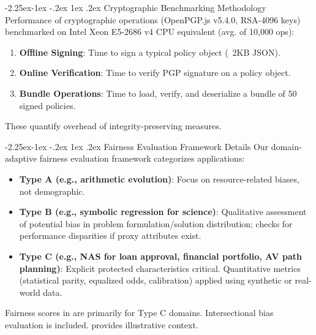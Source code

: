 \documentclass[manuscript,screen,9pt]{acmart}
\makeatletter
\renewcommand\subsection{\@startsection{subsection}{2}{\z@}%
  {-2.25ex\@plus -1ex \@minus -.2ex}%
  {1ex \@plus .2ex}%
  {\normalfont\large\bfseries}}
\makeatother
\begin{document}
\begin{table}[!htb]
\subsection{Cryptographic Benchmarking Methodology}
Performance of cryptographic operations (OpenPGP.js v5.4.0, RSA-4096 keys) benchmarked on Intel Xeon E5-2686 v4 CPU equivalent (avg. of 10,000 ops):
\begin{enumerate}[leftmargin=*,itemsep=1pt,parsep=1pt]
    \item \textbf{Offline Signing}: Time to sign a typical policy object (~2KB JSON).
    \item \textbf{Online Verification}: Time to verify PGP signature on a policy object.
    \item \textbf{Bundle Operations}: Time to load, verify, and deserialize a bundle of 50 signed policies.
\end{enumerate}
These quantify overhead of integrity-preserving measures.

\subsection{Fairness Evaluation Framework Details}
Our domain-adaptive fairness evaluation framework categorizes applications:
\begin{itemize}[leftmargin=*,itemsep=1pt,parsep=1pt]
    \item \textbf{Type A (e.g., arithmetic evolution)}: Focus on resource-related biases, not demographic.
    \item \textbf{Type B (e.g., symbolic regression for science)}: Qualitative assessment of potential bias in problem formulation/solution distribution; checks for performance disparities if proxy attributes exist.
    \item \textbf{Type C (e.g., NAS for loan approval, financial portfolio, AV path planning)}: Explicit protected characteristics critical. Quantitative metrics (statistical parity, equalized odds, calibration) applied using synthetic or real-world data.
\end{itemize}
Fairness scores in  are primarily for Type C domains. Intersectional bias evaluation is included.  provides illustrative context.


\end{table}
\end{document}
